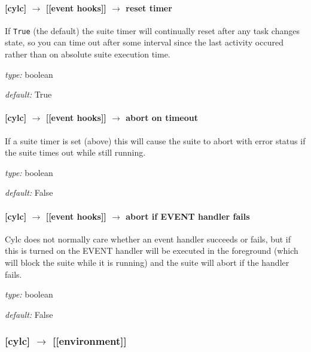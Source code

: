 \paragraph[reset timer]{[cylc] $\rightarrow$ [[event hooks]] $\rightarrow$ reset timer}

If \lstinline=True= (the default) the suite timer will continually reset
after any task changes state, so you can time out after some interval
since the last activity occured rather than on absolute suite execution
time.

\begin{myitemize}
    \item {\em type:} boolean
    \item {\em default:} True
\end{myitemize}

\paragraph[abort on timeout]{[cylc] $\rightarrow$ [[event hooks]] $\rightarrow$ abort on timeout}

If a suite timer is set (above) this will cause the suite to abort with
error status if the suite times out while still running.

\begin{myitemize}
    \item {\em type:} boolean
    \item {\em default:} False
\end{myitemize}

\paragraph[abort if startup handler fails]{[cylc] $\rightarrow$ [[event hooks]] $\rightarrow$ abort if EVENT handler fails}

Cylc does not normally care whether an event handler succeeds or fails,
but if this is turned on the EVENT handler will be executed in the
foreground (which will block the suite while it is running) and the
suite will abort if the handler fails.

\begin{myitemize}
    \item {\em type:} boolean
    \item {\em default:} False
\end{myitemize}

\subsubsection[{[[}environment{]]} ]{[cylc] $\rightarrow$ [[environment]]}

